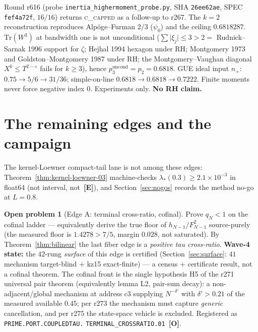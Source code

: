 \documentclass[11pt]{article}
\newcommand{\mE}{\textcolor{certgreen}{\textbf{[E]}}}
\newcommand{\mO}{\textcolor{openred}{\textbf{[O]}}}
\theoremstyle{definition}
\newtheorem{openproblem}[theorem]{Open problem}
\theoremstyle{remark}
\begin{document}
\noindent Round r616 (probe \texttt{inertia\_highermoment\_probe.py},
SHA \texttt{26ee62ae}, SPEC \texttt{fef4a72f}, $16/16$) returns
\textsc{c\_capped} as a follow-up to r267.  The $k=2$ reconstruction
reproduces Alp\"oge--Furman $2/3$ ($\psi_0$) and the ceiling
$0.6818287$.  $\mathrm{Tr}(W^3)$ at bandwidth one is not
unconditional ($\sum\lvert\xi_j\rvert\le 3>2=$ Rudnick--Sarnak 1996
support for $\zeta$; Hejhal 1994 hexagon under RH; Montgomery 1973 and
Goldston--Montgomery 1987 under RH; the Montgomery--Vaughan diagonal
$X^k\le T^{2-\varepsilon}$ fails for $k\ge 3$), hence
$p_3^{\mathrm{uncond}}=p_2=0.6818$.  GUE ideal input $n_+$:
$0.75\to 5/6\to 31/36$; simple-on-line $0.6818\to 0.6818\to 0.7222$.
Finite moments never force negative index $0$.  Experiments only.
\textbf{No RH claim.}

\section{The remaining edges and the campaign}\label{sec:edges}

\noindent The kernel-Loewner compact-tail lane is not among these edges:
Theorem~\ref{thm:kernel-loewner-03} machine-checks $\lambda_*(0.3)\ge 2.1{\times}10^{-3}$ in float64
(not interval, not~\mE),
and Section~\ref{sec:nogos} records the method no-go at $L=0.8$.

\begin{openproblem}[Edge A: terminal cross-ratio, cofinal]
Prove $q_N<1$ on the cofinal ladder --- equivalently derive the true floor
of $h_{N-1}/F_{N-1}^2$ source-purely (the measured floor is $1.4278>7/5$,
margin $0.028$, not saturated).  By Theorem~\ref{thm:bilinear} the last
fiber edge is a \emph{positive tau cross-ratio}.  \textbf{Wave-4 state:}
the $42$-rung \emph{surface} of this edge is certified
(Section~\ref{sec:surface}: $41$ mechanism target-blind $+$ kz15
exact-finite) --- a census $+$ certificate result, not a cofinal theorem.
The cofinal front is the single hypothesis H5 of the r271 universal pair
theorem (equivalently lemma L2, pair-sum decay): a non-adjacent/global
mechanism at address c3 supplying $N^{-\delta'}$ with $\delta'>0.21$ of
the measured available $0.45$; per r273 the mechanism must capture
\emph{generic} cancellation, and per r275 the state-space vehicle is
excluded.  Registered as \texttt{PRIME.PORT.COUPLEDTAU.}\allowbreak
\texttt{TERMINAL\_CROSSRATIO.01}~\mO.
\end{openproblem}
\end{document}
